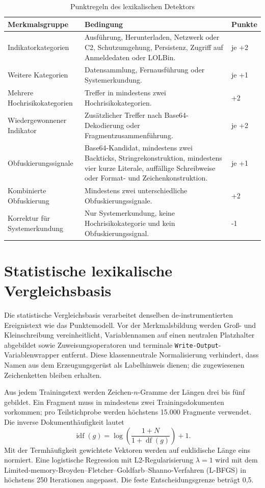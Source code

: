 \documentclass[12pt,a4paper,oneside,parskip=half]{scrreprt}
\begin{document}
\begin{table}[H]
\centering
\caption[Punktregeln des lexikalischen Detektors]{Punktregeln des lexikalischen Detektors}
\label{tab:score-model}
\small
\begin{tabularx}{\textwidth}{|L{4.1cm}|Y|C{1.5cm}|}
\hline
\textbf{Merkmalsgruppe} & \textbf{Bedingung} & \textbf{Punkte}\\
\hline
Indikatorkategorien & Ausführung, Herunterladen, Netzwerk oder C2, Schutzumgehung, Persistenz, Zugriff auf Anmeldedaten oder LOLBin. & je +2\\
\hline
Weitere Kategorien & Datensammlung, Fernausführung oder Systemerkundung. & je +1\\
\hline
Mehrere Hochrisikokategorien & Treffer in mindestens zwei Hochrisikokategorien. & +2\\
\hline
Wiedergewonnener Indikator & Zusätzlicher Treffer nach Base64-Dekodierung oder Fragmentzusammenführung. & je +2\\
\hline
Obfuskierungssignale & Base64-Kandidat, mindestens zwei Backticks, Stringrekonstruktion, mindestens vier kurze Literale, auffällige Schreibweise oder Format- und Zeichenkonstruktion. & je +1\\
\hline
Kombinierte Obfuskierung & Mindestens zwei unterschiedliche Obfuskierungssignale. & +2\\
\hline
Korrektur für Systemerkundung & Nur Systemerkundung, keine Hochrisikokategorie und kein Obfuskierungssignal. & -1\\
\hline
\end{tabularx}
\end{table}
\section{Statistische lexikalische Vergleichsbasis}
Die statistische Vergleichsbasis verarbeitet denselben de-instrumentierten Ereignistext wie das Punktemodell. Vor der Merkmalsbildung werden Groß- und Kleinschreibung vereinheitlicht, Variablennamen auf einen neutralen Platzhalter abgebildet sowie Zuweisungsoperatoren und terminale \texttt{Write-Output}-Variablenwrapper entfernt. Diese klassenneutrale Normalisierung verhindert, dass Namen aus dem Erzeugungsgerüst als Labelhinweis dienen; die zugewiesenen Zeichenketten bleiben erhalten.

Aus jedem Trainingstext werden Zeichen-\(n\)-Gramme der Längen drei bis fünf gebildet. Ein Fragment muss in mindestens zwei Trainingsdokumenten vorkommen; pro Teilstichprobe werden höchstens 15.000 Fragmente verwendet. Die inverse Dokumenthäufigkeit lautet
\[
\operatorname{idf}(g)=\log\left(\frac{1+N}{1+\operatorname{df}(g)}\right)+1.
\]
Mit der Termhäufigkeit gewichtete Vektoren werden auf euklidische Länge eins normiert. Eine logistische Regression mit L2-Regularisierung \(\lambda=1\) wird mit dem Limited-memory-Broyden--Fletcher--Goldfarb--Shanno-Verfahren (L-BFGS) in höchstens 250 Iterationen angepasst. Die feste Entscheidungsgrenze beträgt 0{,}5.
\end{document}
